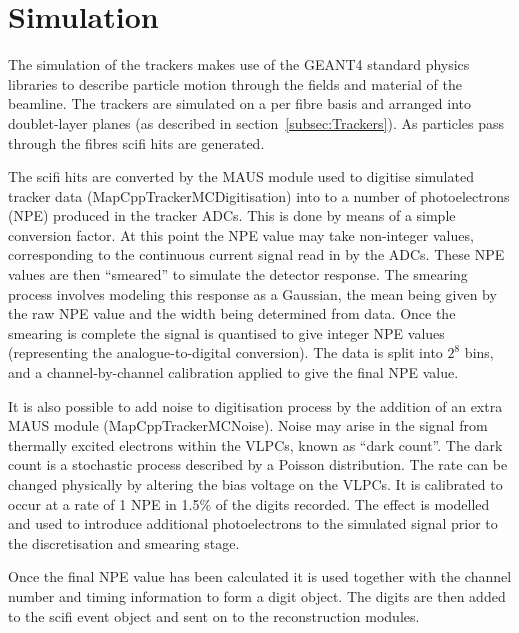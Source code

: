 \section{Simulation}
\label{sec:Simulation}

The simulation of the trackers makes use of the GEANT4 standard physics libraries to describe particle motion through the fields and material of the beamline. The trackers are simulated on a per fibre basis and arranged into doublet-layer planes (as described in section~\ref{subsec:Trackers}). As particles pass through the fibres scifi hits are generated. 

The scifi hits are converted by the MAUS module used to digitise simulated tracker data (MapCppTrackerMCDigitisation) into to a number of photoelectrons (NPE) produced in the tracker ADCs. This is done by means of a simple conversion factor. At this point the NPE value may take non-integer values, corresponding to the continuous current signal read in by the ADCs. These NPE values are then ``smeared'' to simulate the detector response. The smearing process involves modeling this response as a Gaussian, the mean being given by the raw NPE value and the width being determined from data. Once the smearing is complete the signal is quantised to give integer NPE values (representing the analogue-to-digital conversion). The data is split into $2^8$ bins, and a channel-by-channel calibration applied to give the final NPE value.

It is also possible to add noise to digitisation process by the addition of an extra MAUS module (MapCppTrackerMCNoise). Noise may arise in the signal from thermally excited electrons within the VLPCs, known as ``dark count''. The dark count is a stochastic process described by a Poisson distribution. The rate can be changed physically by altering the bias voltage on the VLPCs. It is calibrated to occur at a rate of 1 NPE in 1.5\% of the digits recorded. The effect is modelled and used to introduce additional photoelectrons to the simulated signal prior to the discretisation and smearing stage. 

Once the final NPE value has been calculated it is used together with the channel number and timing information to form a digit object. The digits are then added to the scifi event object and sent on to the reconstruction modules.



